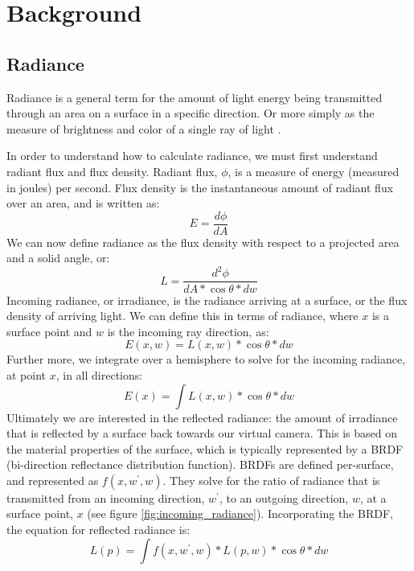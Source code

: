 \chapter{Background}

\section{Radiance}
\label{sec:radiance}

Radiance is a general term for the amount of light energy being transmitted through an area on a surface in a specific direction. Or more simply as the measure of brightness and color of a single ray of light \cite{bib:rtr}.

In order to understand how to calculate radiance, we must first understand radiant flux and flux density. Radiant flux, $\phi$, is a measure of energy (measured in joules) per second. Flux density is the instantaneous amount of radiant flux over an area, and is written as:
\begin{equation}
E = \frac{d\phi}{dA}
\label{eqn:flux_density}
\end{equation}
We can now define radiance as the flux density with respect to a projected area and a solid angle, or:
\begin{equation}
L = \frac{d^{2}\phi}{dA*\cos\theta*dw}
\label{eqn:radiance}
\end{equation}
Incoming radiance, or irradiance, is the radiance arriving at a surface, or the flux density of arriving light. We can define this in terms of radiance, where $x$ is a surface point and $w$ is the incoming ray direction, as:
\begin{equation}
E(x,w) = L(x,w) * \cos\theta * dw
\label{eqn:irradiance}
\end{equation}
Further more, we integrate over a hemisphere to solve for the incoming radiance, at point $x$, in all directions:
\begin{equation}
E(x) = \int L(x,w) * \cos\theta * dw
\label{eqn:irradiance_integral}
\end{equation}
Ultimately we are interested in the reflected radiance: the amount of irradiance that is reflected by a surface back towards our virtual camera. This is based on the material properties of the surface, which is typically represented by a BRDF (bi-direction reflectance distribution function). BRDFs are defined per-surface, and represented as $f(x, w^{\prime}, w)$. They solve for the ratio of radiance that is transmitted from an incoming direction, $w^{\prime}$, to an outgoing direction, $w$, at a surface point, $x$ (see figure \ref{fig:incoming_radiance}). Incorporating the BRDF, the equation for reflected radiance is:
\begin{equation}
L(p) = \int f(x, w^{\prime}, w) * L(p,w) * \cos\theta * dw
\label{eqn:radiance_integral}
\end{equation}

